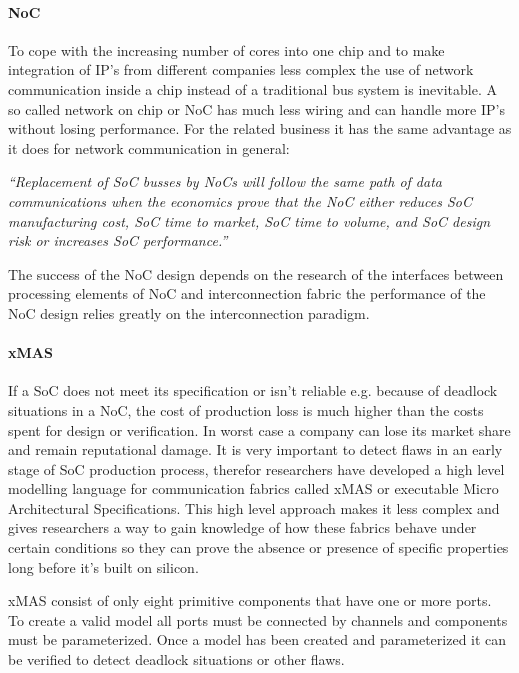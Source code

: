 \paragraph{NoC}

To cope with the increasing number of cores into one chip and to make
integration of IP's from different companies less complex the use of network
communication inside a chip instead of a traditional bus system is inevitable. A
so called network on chip or NoC has much less wiring and can handle more IP's
without losing performance. For the related business it has the same advantage
as it does for network communication in general:

\textit{``Replacement of SoC busses by NoCs will follow the same path of data
communications when the economics prove that the NoC either reduces SoC
manufacturing cost, SoC time to market, SoC time to volume, and SoC design risk
or increases SoC performance.''} \cite{NoC-busses} 

The success of the NoC design depends on the research of the interfaces between
processing elements of NoC and interconnection fabric the performance of the NoC
design relies greatly on the interconnection paradigm.

\paragraph{xMAS}

If a SoC does not meet its specification or isn't reliable e.g. because of
deadlock situations in a NoC, the cost of production loss is much higher than
the costs spent for design or verification. In worst case a company can lose its
market share and remain reputational damage. It is very important to detect
flaws in an early stage of SoC production process, therefor researchers have
developed a high level modelling language for communication fabrics called xMAS
or executable Micro Architectural Specifications. This high level approach makes
it less complex and gives researchers a way to gain knowledge of how these
fabrics behave under certain conditions so they can prove the absence or
presence of specific properties long before it's built on silicon.

xMAS consist of only eight primitive components that have one or more ports. To
create a valid model all ports must be connected by channels and components must
be parameterized. Once a model has been created and parameterized it can be
verified to detect deadlock situations or other flaws. 

